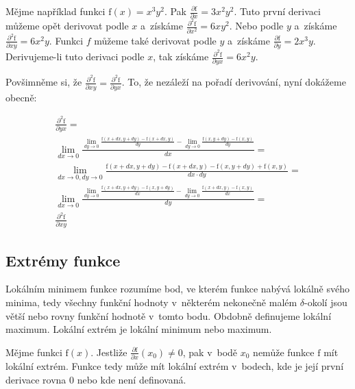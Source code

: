 Mějme například funkci \(\mathrm{f}(x) = x^3 y^2\). Pak \(\frac{\partial \mathrm{f}}{\partial x} = 3 x^2 y^2\). Tuto první derivaci můžeme opět derivovat podle \(x\) a~získáme \(\frac{\partial^2 \mathrm{f}}{\partial x^2} = 6 x y^2\). Nebo podle \(y\) a~získáme \(\frac{\partial^2 \mathrm{f}}{\partial xy} = 6 x^2 y\).
Funkci \(f\) můžeme také derivovat podle \(y\) a~získáme \(\frac{\partial \mathrm{f}}{\partial y} = 2 x^3 y\). Derivujeme-li tuto derivaci podle \(x\), tak získáme \(\frac{\partial^2 \mathrm{f}}{\partial yx} = 6 x^2 y\).

Povšimněme si, že \(\frac{\partial^2 \mathrm{f}}{\partial xy} = \frac{\partial^2 \mathrm{f}}{\partial yx}\). To, že nezáleží na pořadí derivování, nyní dokážeme obecně:

\begin{equation}
\begin{split}
\frac{\partial^2 \mathrm{f}}{\partial yx} = \\
\lim_{dx \to 0} \frac{\lim_{dy \to 0} \frac{\mathrm{f}(x+dx, y+dy) - \mathrm{f}(x+dx, y)}{dy} - \lim_{dy \to 0} \frac{\mathrm{f}(x, y+dy) - \mathrm{f}(x, y)}{dy}}{dx} = \\
\lim_{dx \to 0, dy \to 0} \frac{\mathrm{f}(x+dx, y+dy) - \mathrm{f}(x+dx, y) - \mathrm{f}(x, y+dy) + \mathrm{f}(x, y)}{dx \cdot dy} = \\
\lim_{dx \to 0} \frac{\lim_{dy \to 0} \frac{\mathrm{f}(x+dx, y+dy) - \mathrm{f}(x, y+dy)}{dx} - \lim_{dy \to 0} \frac{\mathrm{f}(x+dx, y) - \mathrm{f}(x, y)}{dx}}{dy} = \\
\frac{\partial^2 \mathrm{f}}{\partial xy}
\end{split}
\end{equation}

\subsection{Extrémy funkce}

Lokálním minimem funkce rozumíme bod, ve kterém funkce nabývá lokálně svého minima, tedy všechny funkční hodnoty v~některém nekonečně malém \(\delta\)-okolí jsou větší nebo rovny funkční hodnotě v~tomto bodu. Obdobně definujeme lokální maximum. Lokální extrém je lokální minimum nebo maximum.

\begin{fact}
Mějme funkci \(\mathrm{f}(x)\). Jestliže \(\frac{\partial \mathrm{f}}{\partial x}(x_0) \neq 0\), pak v~bodě \(x_0\) nemůže funkce \(\mathrm{f}\) mít lokální extrém.
Funkce tedy může mít lokální extrém v~bodech, kde je její první derivace rovna 0 nebo kde není definovaná. 
\end{fact}


